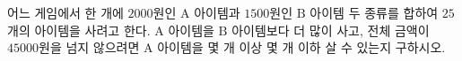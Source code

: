 어느 게임에서 한 개에 $2000$원인 $\mathrm{A}$ 아이템과 $1500$원인 $\mathrm{B}$ 아이템 두 종류를 합하여 $25$개의 아이템을 사려고 한다. $\mathrm{A}$ 아이템을 $\mathrm{B}$ 아이템보다 더 많이 사고, 전체 금액이 $45000$원을 넘지 않으려면 $\mathrm{A}$ 아이템을 몇 개 이상 몇 개 이하 살 수 있는지 구하시오.
